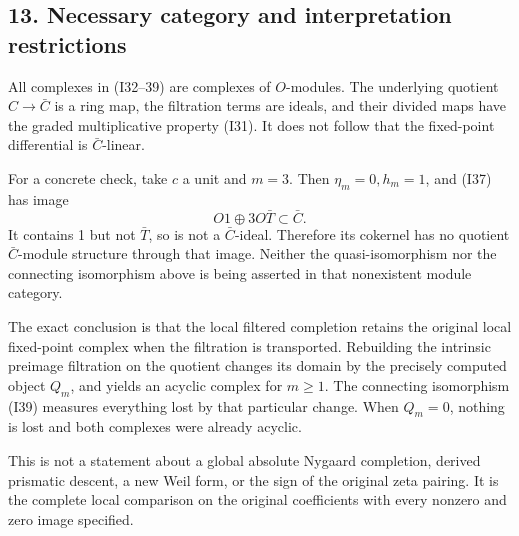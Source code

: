 \documentclass[
  10pt,
]{article}
\begin{document}
\subsection{13. Necessary category and interpretation
restrictions}\label{necessary-category-and-interpretation-restrictions}

All complexes in (I32--39) are complexes of \(O\)-modules. The
underlying quotient \(C\to\bar C\) is a ring map, the filtration terms
are ideals, and their divided maps have the graded multiplicative
property (I31). It does not follow that the fixed-point differential is
\(\bar C\)-linear.

For a concrete check, take \(c\) a unit and \(m=3\). Then
\(\eta_m=0,h_m=1\), and (I37) has image \[
O1\oplus3O\bar T\subset\bar C.
\] It contains 1 but not \(\bar T\), so is not a \(\bar C\)-ideal.
Therefore its cokernel has no quotient \(\bar C\)-module structure
through that image. Neither the quasi-isomorphism nor the connecting
isomorphism above is being asserted in that nonexistent module category.

The exact conclusion is that the local filtered completion retains the
original local fixed-point complex when the filtration is transported.
Rebuilding the intrinsic preimage filtration on the quotient changes its
domain by the precisely computed object \(Q_m\), and yields an acyclic
complex for \(m\ge1\). The connecting isomorphism (I39) measures
everything lost by that particular change. When \(Q_m=0\), nothing is
lost and both complexes were already acyclic.

This is not a statement about a global absolute Nygaard completion,
derived prismatic descent, a new Weil form, or the sign of the original
zeta pairing. It is the complete local comparison on the original
coefficients with every nonzero and zero image specified.
\end{document}
